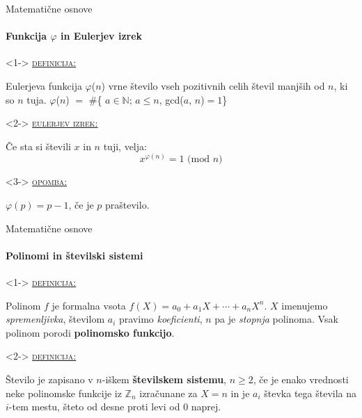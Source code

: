 \documentclass[a4paper, 12pt]{beamer} %
\newcommand{\Zn}{\mathbb{Z}_n}
\newenvironment{matematika}[1]{
\textcolor{bostonuniversityred}{\underline{\textsc{#1:}}}
}{
}
\begin{document}
\begin{frame}{Matematične osnove}
\framesubtitle{Funkcija $\varphi$ in Eulerjev izrek}
\begin{block}<1->{}
\begin{matematika}{definicija}
Eulerjeva funkcija $\varphi$($n$) vrne število vseh pozitivnih celih števil manjših od $n$, ki so $n$ tuja.
\newline
\newline
$\varphi$($n$) $=$ \#\{ $a \in \mathbb{N}$; $a \leq n$, gcd($a$, $n$)$=1$\}
\end{matematika}
\end{block}

\begin{block}<2->{}
\begin{matematika}{eulerjev izrek}
Če sta si števili $x$ in $n$ tuji, velja:
\[
x^{\varphi(n)} = 1 \text{ (mod }n)
\]
\end{matematika}
\end{block}

\begin{block}<3->{}
\begin{matematika}{opomba}
$\varphi(p) = p-1$, če je $p$ praštevilo.
\end{matematika}
\end{block}
\end{frame}

\begin{frame}{Matematične osnove}
\framesubtitle{Polinomi in številski sistemi}
\begin{block}<1->{}
\begin{matematika}{definicija}
Polinom $f$ je formalna vsota $f(X) = a_0 + a_1X + \cdots + a_nX^n.$ $X$ imenujemo \emph{spremenljivka}, številom $a_i$ pravimo \emph{koeficienti}, $n$ pa je \emph{stopnja} polinoma. Vsak polinom porodi \textbf{polinomsko funkcijo}.
\end{matematika}
\end{block}

\begin{block}<2->{}
\begin{matematika}{definicija}
Število je zapisano v $n$-iškem \textbf{številskem sistemu}, $n \geq 2$, če je enako vrednosti neke polinomske funkcije iz $\Zn$ izračunane za $X = n$ in je $a_i$ števka tega števila na $i$-tem mestu, šteto od desne proti levi od $0$ naprej.
\end{matematika}
\end{block}
\end{frame}
\end{document}
